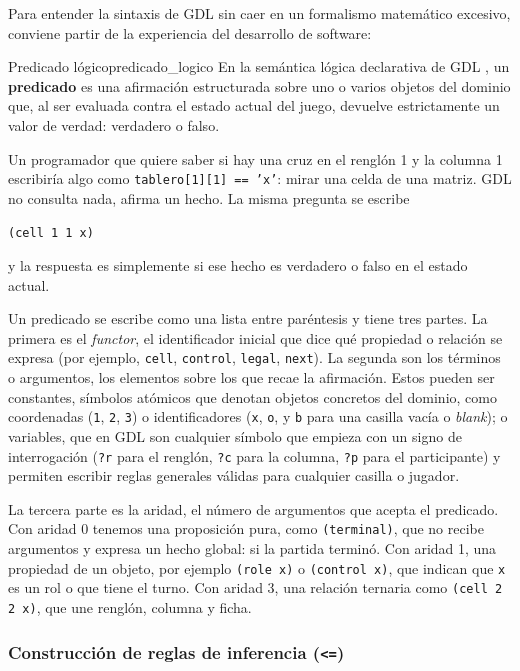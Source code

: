 Para entender la sintaxis de GDL sin caer en un formalismo matemático excesivo, conviene partir de la experiencia del desarrollo de software:

\begin{definicion}{Predicado lógico}{predicado_logico}
En la semántica lógica declarativa de GDL \cite{Love2008GDL, GeneserethThielscher2014}, un \textbf{predicado} es una afirmación estructurada sobre uno o varios objetos del dominio que, al ser evaluada contra el estado actual del juego, devuelve estrictamente un valor de verdad: verdadero o falso.
\end{definicion}

Un programador que quiere saber si hay una cruz en el renglón 1 y la columna 1 escribiría algo como \texttt{tablero[1][1] == 'x'}: mirar una celda de una matriz. GDL no consulta nada, afirma un hecho. La misma pregunta se escribe
\begin{center}
    \texttt{(cell 1 1 x)}
\end{center}
y la respuesta es simplemente si ese hecho es verdadero o falso en el estado actual.

Un predicado se escribe como una lista entre paréntesis y tiene tres partes. La primera es el \textit{functor}, el identificador inicial que dice qué propiedad o relación se expresa (por ejemplo, \texttt{cell}, \texttt{control}, \texttt{legal}, \texttt{next}). La segunda son los términos o argumentos, los elementos sobre los que recae la afirmación. Estos pueden ser constantes, símbolos atómicos que denotan objetos concretos del dominio, como coordenadas (\texttt{1}, \texttt{2}, \texttt{3}) o identificadores (\texttt{x}, \texttt{o}, y \texttt{b} para una casilla vacía o \textit{blank}); o variables, que en GDL son cualquier símbolo que empieza con un signo de interrogación (\texttt{?r} para el renglón, \texttt{?c} para la columna, \texttt{?p} para el participante) y permiten escribir reglas generales válidas para cualquier casilla o jugador.

La tercera parte es la aridad, el número de argumentos que acepta el predicado. Con aridad 0 tenemos una proposición pura, como \texttt{(terminal)}, que no recibe argumentos y expresa un hecho global: si la partida terminó. Con aridad 1, una propiedad de un objeto, por ejemplo \texttt{(role x)} o \texttt{(control x)}, que indican que \texttt{x} es un rol o que tiene el turno. Con aridad 3, una relación ternaria como \texttt{(cell 2 2 x)}, que une renglón, columna y ficha.

\subsubsection{Construcción de reglas de inferencia (\texorpdfstring{\texttt{<=}}{<=})}
\label{subsec:reglas_inferencia}

